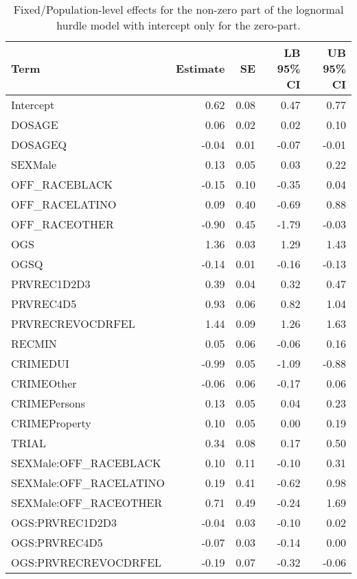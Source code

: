 \documentclass[
  letterpaper,
  DIV=11,
  numbers=noendperiod]{scrartcl}
\begin{document}
\hypertarget{tbl-brms-hurdle-fe-int-only}{}
\begin{table}
\caption{\label{tbl-brms-hurdle-fe-int-only}Fixed/Population-level effects for the non-zero part of the lognormal
hurdle model with intercept only for the zero-part. }\tabularnewline

\centering
\begin{tabular}{lrrrr}
\toprule
Term & Estimate & SE & LB 95\% CI & UB 95\% CI\\
\midrule
Intercept & 0.62 & 0.08 & 0.47 & 0.77\\
DOSAGE & 0.06 & 0.02 & 0.02 & 0.10\\
DOSAGEQ & -0.04 & 0.01 & -0.07 & -0.01\\
SEXMale & 0.13 & 0.05 & 0.03 & 0.22\\
OFF\_RACEBLACK & -0.15 & 0.10 & -0.35 & 0.04\\
\addlinespace
OFF\_RACELATINO & 0.09 & 0.40 & -0.69 & 0.88\\
OFF\_RACEOTHER & -0.90 & 0.45 & -1.79 & -0.03\\
OGS & 1.36 & 0.03 & 1.29 & 1.43\\
OGSQ & -0.14 & 0.01 & -0.16 & -0.13\\
PRVREC1D2D3 & 0.39 & 0.04 & 0.32 & 0.47\\
\addlinespace
PRVREC4D5 & 0.93 & 0.06 & 0.82 & 1.04\\
PRVRECREVOCDRFEL & 1.44 & 0.09 & 1.26 & 1.63\\
RECMIN & 0.05 & 0.06 & -0.06 & 0.16\\
CRIMEDUI & -0.99 & 0.05 & -1.09 & -0.88\\
CRIMEOther & -0.06 & 0.06 & -0.17 & 0.06\\
\addlinespace
CRIMEPersons & 0.13 & 0.05 & 0.04 & 0.23\\
CRIMEProperty & 0.10 & 0.05 & 0.00 & 0.19\\
TRIAL & 0.34 & 0.08 & 0.17 & 0.50\\
SEXMale:OFF\_RACEBLACK & 0.10 & 0.11 & -0.10 & 0.31\\
SEXMale:OFF\_RACELATINO & 0.19 & 0.41 & -0.62 & 0.98\\
\addlinespace
SEXMale:OFF\_RACEOTHER & 0.71 & 0.49 & -0.24 & 1.69\\
OGS:PRVREC1D2D3 & -0.04 & 0.03 & -0.10 & 0.02\\
OGS:PRVREC4D5 & -0.07 & 0.03 & -0.14 & 0.00\\
OGS:PRVRECREVOCDRFEL & -0.19 & 0.07 & -0.32 & -0.06\\
\bottomrule
\end{tabular}
\end{table}
\end{document}
